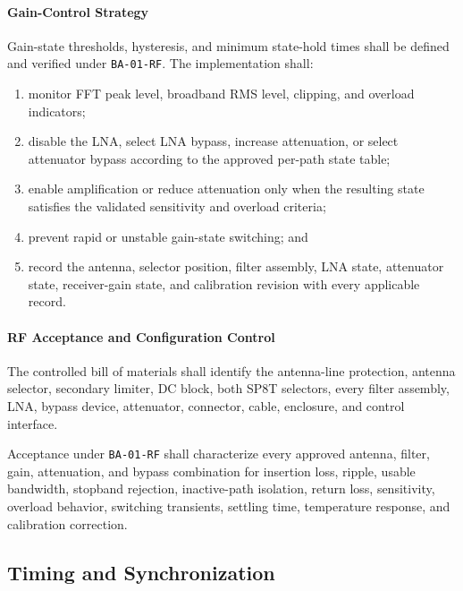 \documentclass[11pt,a4paper]{article}
\begin{document}
	\paragraph*{Gain-Control Strategy}
	
	Gain-state thresholds, hysteresis, and minimum state-hold times shall be
	defined and verified under \texttt{BA-01-RF}. The implementation shall:
	
	\begin{enumerate}
		\item monitor FFT peak level, broadband RMS level, clipping, and overload
		indicators;
		\item disable the LNA, select LNA bypass, increase attenuation, or select
		attenuator bypass according to the approved per-path state table;
		\item enable amplification or reduce attenuation only when the resulting
		state satisfies the validated sensitivity and overload criteria;
		\item prevent rapid or unstable gain-state switching; and
		\item record the antenna, selector position, filter assembly, LNA state,
		attenuator state, receiver-gain state, and calibration revision with every
		applicable record.
	\end{enumerate}
	
	\paragraph*{RF Acceptance and Configuration Control}
	
	The controlled bill of materials shall identify the antenna-line protection,
	antenna selector, secondary limiter, DC block, both SP8T selectors, every
	filter assembly, LNA, bypass device, attenuator, connector, cable, enclosure,
	and control interface.
	
	Acceptance under \texttt{BA-01-RF} shall characterize every approved antenna,
	filter, gain, attenuation, and bypass combination for insertion loss, ripple,
	usable bandwidth, stopband rejection, inactive-path isolation, return loss,
	sensitivity, overload behavior, switching transients, settling time,
	temperature response, and calibration correction.
	
	\subsection*{Timing and Synchronization}
	
\end{document}
